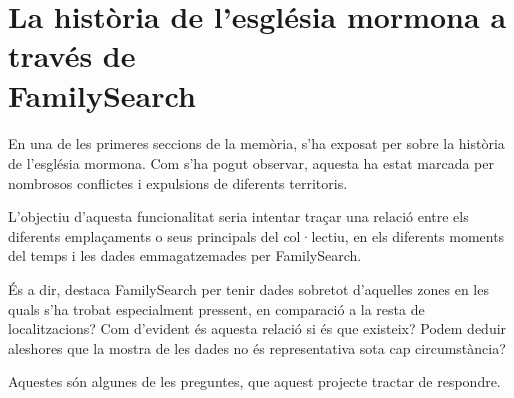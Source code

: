 \section{La història de l'església mormona a través de\\Family\-Search}

    \paragraph{}
    En una de les primeres seccions de la memòria, s'ha exposat per sobre la història de l'església mormona. Com s'ha pogut observar, aquesta ha estat marcada per nombrosos conflictes i expulsions de diferents territoris.

    L'objectiu d'aquesta funcionalitat seria intentar traçar una relació entre els di\-fe\-rents emplaçaments o seus principals del col·lectiu, en els diferents moments del temps i les dades emmagatzemades per FamilySearch.

    És a dir, destaca FamilySearch per tenir dades sobretot d'aquelles zones en les quals s'ha trobat especialment pressent, en comparació a la resta de localitzacions? Com d'evident és aquesta relació si és que existeix? Podem deduir aleshores que la mostra de les dades no és representativa sota cap circumstància?

    Aquestes són algunes de les preguntes, que aquest projecte tractar de respondre.
